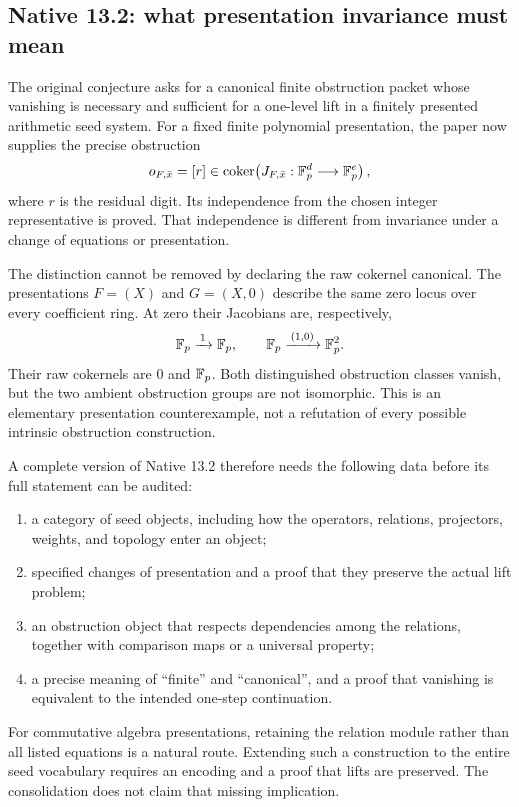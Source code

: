 \subsection{Native 13.2: what presentation invariance must mean}
\label{subsec:native132}

The original conjecture asks for a canonical finite obstruction packet whose
vanishing is necessary and sufficient for a one-level lift in a finitely
presented arithmetic seed system. For a fixed finite polynomial presentation,
the paper now supplies the precise obstruction
\[
o_{F,\bar x}=[r]\in
\operatorname{coker}\!\left(J_{F,\bar x}:\mathbb F_p^d\longrightarrow\mathbb F_p^e\right),
\]
where $r$ is the residual digit. Its independence from the chosen integer
representative is proved. That independence is different from invariance
under a change of equations or presentation.

The distinction cannot be removed by declaring the raw cokernel canonical.
The presentations $F=(X)$ and $G=(X,0)$ describe the same zero locus over every
coefficient ring. At zero their Jacobians are, respectively,
\[
\mathbb F_p\xrightarrow{\,1\,}\mathbb F_p,
\qquad
\mathbb F_p\xrightarrow{\,(1,0)\,}\mathbb F_p^2.
\]
Their raw cokernels are $0$ and $\mathbb F_p$. Both distinguished obstruction classes
vanish, but the two ambient obstruction groups are not isomorphic. This is
an elementary presentation counterexample, not a refutation of every possible
intrinsic obstruction construction.

A complete version of Native 13.2 therefore needs the following data before
its full statement can be audited:
\begin{enumerate}
\item a category of seed objects, including how the operators, relations,
projectors, weights, and topology enter an object;
\item specified changes of presentation and a proof that they preserve the
actual lift problem;
\item an obstruction object that respects dependencies among the relations,
together with comparison maps or a universal property;
\item a precise meaning of ``finite'' and ``canonical'', and a proof that
vanishing is equivalent to the intended one-step continuation.
\end{enumerate}
For commutative algebra presentations, retaining the relation module rather
than all listed equations is a natural route. Extending such a construction
to the entire seed vocabulary requires an encoding and a proof that lifts
are preserved. The consolidation does not claim that missing implication.

